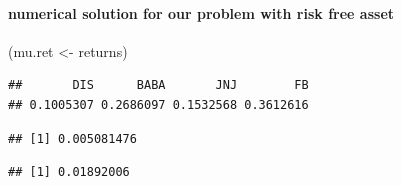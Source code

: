 \documentclass[]{article}
\newenvironment{Shaded}{\begin{snugshade}}{\end{snugshade}}
\newcommand{\KeywordTok}[1]{\textcolor[rgb]{0.13,0.29,0.53}{\textbf{#1}}}
\newcommand{\DataTypeTok}[1]{\textcolor[rgb]{0.13,0.29,0.53}{#1}}
\newcommand{\FloatTok}[1]{\textcolor[rgb]{0.00,0.00,0.81}{#1}}
\newcommand{\StringTok}[1]{\textcolor[rgb]{0.31,0.60,0.02}{#1}}
\newcommand{\OperatorTok}[1]{\textcolor[rgb]{0.81,0.36,0.00}{\textbf{#1}}}
\newcommand{\NormalTok}[1]{#1}
\let\oldparagraph\paragraph
\renewcommand{\paragraph}[1]{\oldparagraph{#1}\mbox{}}
\begin{document}
\paragraph{numerical solution for our problem with risk free
asset}\label{numerical-solution-for-our-problem-with-risk-free-asset}

\begin{Shaded}
\begin{Highlighting}[]
\NormalTok{(mu.ret <-}\StringTok{ }\NormalTok{returns)}
\end{Highlighting}
\end{Shaded}

\begin{verbatim}
##       DIS      BABA       JNJ        FB 
## 0.1005307 0.2686097 0.1532568 0.3612616
\end{verbatim}

\begin{Shaded}
\end{Shaded}

\begin{verbatim}
## [1] 0.005081476
\end{verbatim}

\begin{Shaded}
\end{Shaded}

\begin{verbatim}
## [1] 0.01892006
\end{verbatim}

\begin{Shaded}
\end{Shaded}
\end{document}
